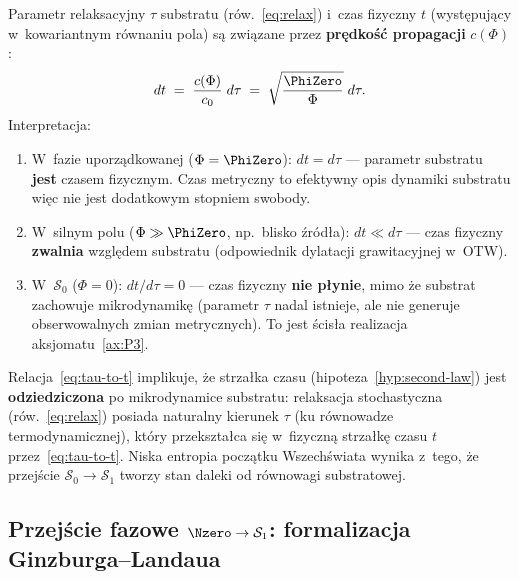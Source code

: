\begin{proposition}%
\label{prop:tau-to-t}
Parametr relaksacyjny $\tau$ substratu (r\'ow.~\ref{eq:relax})
i~czas fizyczny $t$ (wyst\k{e}puj\k{a}cy w~kowariantnym r\'ownaniu
pola) s\k{a} zwi\k{a}zane przez
\textbf{pr\k{e}dko\'s\'c propagacji} $c(\Phi)$:
\begin{equation}\label{eq:tau-to-t}
  dt \;=\; \frac{c(\Phi)}{c_0}\;d\tau
  \;=\; \sqrt{\frac{\PhiZero}{\Phi}}\;d\tau.
\end{equation}
Interpretacja:
\begin{enumerate}[nosep]
  \item W~fazie uporz\k{a}dkowanej ($\Phi = \PhiZero$):
    $dt = d\tau$ --- parametr substratu \textbf{jest} czasem
    fizycznym. Czas metryczny to efektywny opis dynamiki
    substratu wi\k{e}c nie jest dodatkowym stopniem swobody.
  \item W~silnym polu ($\Phi \gg \PhiZero$, np.\ blisko
    \'zr\'od\l{}a): $dt \ll d\tau$ --- czas fizyczny
    \textbf{zwalnia} wzgl\k{e}dem substratu (odpowiednik
    dylatacji grawitacyjnej w~OTW).
  \item W~$\mathcal{S}_0$ ($\Phi = 0$): $dt/d\tau = 0$ ---
    czas fizyczny \textbf{nie p\l{}ynie}, mimo \.ze substrat
    zachowuje mikrodynamik\k{e} (parametr $\tau$ nadal
    istnieje, ale nie generuje obserwowalnych zmian
    metrycznych). To jest \'scis\l{}a realizacja
    aksjomatu~\ref{ax:P3}.
\end{enumerate}
\end{proposition}

\begin{remark}%
\label{rem:arrow-from-substrate}
Relacja~\eqref{eq:tau-to-t} implikuje, \.ze strza\l{}ka czasu
(hipoteza~\ref{hyp:second-law}) jest \textbf{odziedziczona}
po mikrodynamice substratu: relaksacja stochastyczna
(r\'ow.~\ref{eq:relax}) posiada naturalny kierunek
$\tau$ (ku r\'ownowadze termodynamicznej), kt\'ory
przekszta\l{}ca si\k{e} w~fizyczn\k{a} strza\l{}k\k{e}
czasu $t$ przez~\eqref{eq:tau-to-t}. Niska entropia
pocz\k{a}tku Wszech\'swiata wynika z~tego, \.ze
przej\'scie $\mathcal{S}_0 \to \mathcal{S}_1$
tworzy stan daleki od r\'ownowagi substratowej.
\end{remark}

\subsection{Przej\'scie fazowe $\Nzero \to \mathcal{S}_1$:
  formalizacja Ginzburga--Landaua}\label{ssec:GL-transition}

